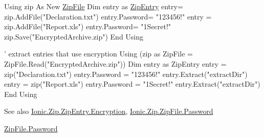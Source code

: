 \begin{DoxyCode}
Using zip As New \mbox{\hyperlink{namespace_super_tiled2_unity_1_1_ionic_1_1_zip_a9ced5352c56e7e0fceff15b534073c83a088ad16b06174c69965e232063ba6d16}{ZipFile}}
    Dim entry as \mbox{\hyperlink{class_super_tiled2_unity_1_1_ionic_1_1_zip_1_1_zip_entry_a440b6d4d136b20dc6bdbdd399397e3a0}{ZipEntry}}
    entry= zip.AddFile(\textcolor{stringliteral}{"Declaration.txt"})
    entry.Password= \textcolor{stringliteral}{"123456!"}
    entry = zip.AddFile(\textcolor{stringliteral}{"Report.xls"})
    entry.Password= \textcolor{stringliteral}{"1Secret!"}
    zip.Save(\textcolor{stringliteral}{"EncryptedArchive.zip"})
End Using


\textcolor{stringliteral}{' extract entries that use encryption}
\textcolor{stringliteral}{Using (zip as ZipFile = ZipFile.Read("EncryptedArchive.zip"))}
\textcolor{stringliteral}{    Dim entry as ZipEntry}
\textcolor{stringliteral}{    entry = zip("Declaration.txt")}
\textcolor{stringliteral}{    entry.Password = "123456!"}
\textcolor{stringliteral}{    entry.Extract("extractDir")}
\textcolor{stringliteral}{    entry = zip("Report.xls")}
\textcolor{stringliteral}{    entry.Password = "1Secret!"}
\textcolor{stringliteral}{    entry.Extract("extractDir")}
\textcolor{stringliteral}{End Using}
\end{DoxyCode}


\begin{DoxySeeAlso}{See also}
\mbox{\hyperlink{class_super_tiled2_unity_1_1_ionic_1_1_zip_1_1_zip_entry_ab8de4882ffe896d2657b27264807ef1c}{Ionic.\+Zip.\+Zip\+Entry.\+Encryption}}, \mbox{\hyperlink{class_super_tiled2_unity_1_1_ionic_1_1_zip_1_1_zip_file_a32b5a69438b625f81303940ec70f9c39}{Ionic.\+Zip.\+Zip\+File.\+Password}}


\end{DoxySeeAlso}
\mbox{\hyperlink{class_super_tiled2_unity_1_1_ionic_1_1_zip_1_1_zip_file_a32b5a69438b625f81303940ec70f9c39}{Zip\+File.\+Password}}\mbox{\label{class_super_tiled2_unity_1_1_ionic_1_1_zip_1_1_zip_entry_a29b5aae0611b60d5906ab25a1ed6c2f1}} 
